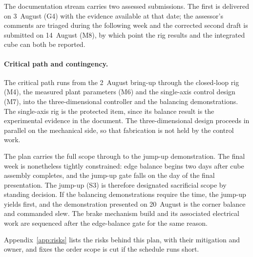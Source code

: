 The documentation stream carries two assessed submissions. The first is delivered
on 3~August (G4) with the evidence available at that date; the assessor's
comments are triaged during the following week and the corrected second draft is
submitted on 14~August (M8), by which point the rig results and the integrated
cube can both be reported.

\paragraph{Critical path and contingency.}
The critical path runs from the 2~August bring-up through the closed-loop rig
(M4), the measured plant parameters (M6) and the single-axis control design
(M7), into the three-dimensional controller and the balancing demonstrations.
The single-axis rig is the protected item, since its balance result is the
experimental evidence in the document. The three-dimensional design proceeds in
parallel on the mechanical side, so that fabrication is not held by the control
work.

The plan carries the full scope through to the jump-up demonstration. The final
week is nonetheless tightly constrained: edge balance begins two days after cube
assembly completes, and the jump-up gate falls on the day of the final
presentation. The jump-up (S3) is therefore designated sacrificial scope by
standing decision. If the balancing demonstrations require the time, the jump-up
yields first, and the demonstration presented on 20~August is the corner balance
and commanded slew. The brake mechanism build and its associated electrical work
are sequenced after the edge-balance gate for the same reason.

Appendix~\ref{app:risks} lists the risks behind this plan, with their
mitigation and owner, and fixes the order scope is cut if the schedule runs
short.

